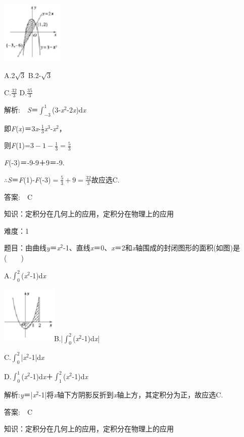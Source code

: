 \documentclass{article} %
\begin{document}
\includegraphics*[width=1.18in, height=1.17in, keepaspectratio=false]{image34}

A.2$\sqrt{3}$       B.2-$\sqrt{3}$

C.$\frac{32}{3}$        D.$\frac{35}{3}$

 解析:　\textit{S}＝$\int_{-3}^{1}$(3-\textit{x}${}^{2}$-2\textit{x})d\textit{x}

即\textit{F}(\textit{x})＝3\textit{x}-$\frac{1}{3}$\textit{x}${}^{3}$-\textit{x}${}^{2}$，

则\textit{F}(1)=$3-1-\frac{1}{3}=\frac{5}{3}$

\textit{F}(-3)＝-9-9＋9＝-9.

$\mathrm{\therefore}$\textit{S}＝\textit{F}(1)-\textit{F}(-3)$=\frac{5}{3}+9=\frac{32}{3}$故应选C.

 答案:　C



 知识：定积分在几何上的应用，定积分在物理上的应用

 难度：1

 题目：由曲线\textit{y}＝\textit{x}${}^{2}$-1、直线\textit{x}＝0、\textit{x}＝2和\textit{x}轴围成的封闭图形的面积(如图)是(　　)

A.$\int_0^2$(\textit{x}${}^{2}$-1)d\textit{x}

\includegraphics*[width=1.03in, height=1.07in, keepaspectratio=false]{image35}B.|$\int_0^2$(\textit{x}${}^{2}$-1)d\textit{x}|

C.$\int_0^2$|\textit{x}${}^{2}$-1|d\textit{x}

D.$\int_0^1$(\textit{x}${}^{2}$-1)d\textit{x}＋$\int_1^2$(\textit{x}${}^{2}$-1)d\textit{x}

 解析:\textit{y}＝|\textit{x}${}^{2}$-1|将\textit{x}轴下方阴影反折到\textit{x}轴上方，其定积分为正，故应选C.

 答案:　C



 知识：定积分在几何上的应用，定积分在物理上的应用
\end{document}
